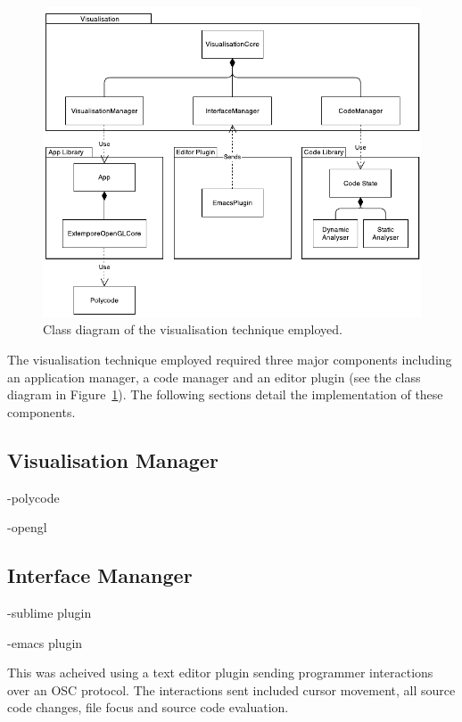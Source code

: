\begin{figure}
  \centering \includegraphics[width=\columnwidth]{../images/diagrams/visualisation-class-diagram.pdf}
  \caption{Class diagram of the visualisation technique employed.}
\label{fig:visualisation-class-diagram}
\end{figure}

The visualisation technique employed required three major components including an application manager, a code manager and an editor plugin (see the class diagram in Figure~\ref{fig:visualisation-class-diagram}). The following sections detail the implementation of these components.

\subsection{Visualisation Manager}

-polycode~\cite{Safrin2013}

-opengl

\subsection{Interface Mananger}
\label{sec:interface-manager}

-sublime plugin

-emacs plugin

This was acheived using a text editor plugin sending programmer interactions over an \ac{OSC} protocol. The interactions sent included cursor movement, all source code changes, file focus and source code evaluation.

